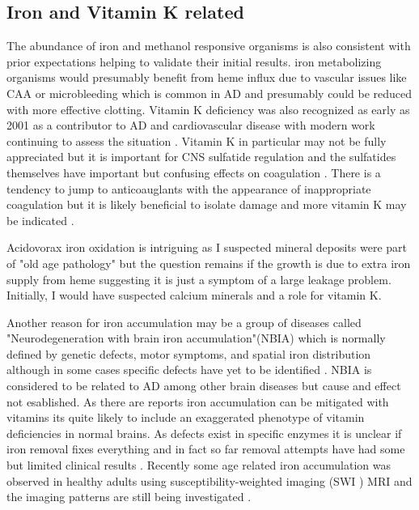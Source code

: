 \documentclass[aps,secnumarabic,balancelastpage,amsmath,amssymb,nofootinbib]{revtex4}
\begin{document}
\subsection{Iron and Vitamin K   related}

The abundance of iron and methanol responsive organisms is also
consistent with prior expectations helping to validate
their initial results.  
iron metabolizing organisms would presumably benefit from
heme influx due to vascular issues like CAA or microbleeding
which is common in AD \cite{PMC5144472} and presumably
could be reduced with more effective clotting. 
Vitamin K deficiency was also recognized as early as 2001 
as a contributor to  AD and cardiovascular disease 
\cite{ALLISON2001151} with modern work continuing to
assess the situation \cite{10.3389/fneur.2019.00239}.
Vitamin K in particular may not be fully appreciated but
it is important for CNS sulfatide regulation
\cite{PMID8914944} \cite{PMC6110503}
and the sulfatides themselves have important but confusing effects
on coagulation \cite{Kyogashima2001}.
There is a tendency to jump to anticoauglants with the
appearance of inappropriate coagulation but it is likely beneficial 
to isolate damage and more vitamin K may be indicated
\cite{marchywka-MJM-2022-015-0.20c}.

Acidovorax iron oxidation  is intriguing as I suspected 
mineral deposits were part
of "old age pathology" but the question remains if the growth
is due to extra iron supply from heme suggesting
it is just a symptom of a large leakage problem. Initially, 
I would have suspected calcium minerals and a role for vitamin K.

Another reason for iron accumulation may be a group of
diseases called "Neurodegeneration with brain iron accumulation"(NBIA)
which is normally defined by genetic defects, motor symptoms, and spatial
iron distribution although in some cases specific
defects have yet to be identified
\cite{KURIAN_MCNEILL_LIN_Childhood_disorders_neurodegeneration_2011}
. 
NBIA is considered to be related to AD among other brain diseases
\cite{WANG2019109068} but cause and effect not esablished.
As there are reports iron accumulation can be mitigated with vitamins 
\cite{PMC9364590} \cite{PMC10091671}
its quite likely to include  an exaggerated
phenotype of vitamin deficiencies in normal brains. 
As defects exist in specific enzymes 
it is unclear if iron removal fixes everything and in fact
so far removal attempts have had some but limited clinical results
\cite{10.3389/fneur.2021.629414}.
Recently some age related iron accumulation
was observed in healthy adults using susceptibility-weighted imaging
(SWI )  MRI \cite{vanderWeijden_vanLaar_Lambrechts_Cortical_pencil_lining_2019}
and the imaging patterns are still being investigated 
\cite{10.3389/fneur.2020.01024}.
\end{document}
